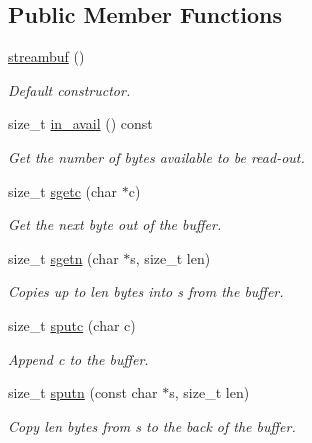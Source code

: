 \subsection*{Public Member Functions}
\begin{DoxyCompactItemize}
\item 
\hyperlink{classuio_1_1streambuf_a990efec101a2ade1c4483b604b3b975f}{streambuf} ()\hypertarget{classuio_1_1streambuf_a990efec101a2ade1c4483b604b3b975f}{}\label{classuio_1_1streambuf_a990efec101a2ade1c4483b604b3b975f}

\begin{DoxyCompactList}\small\item\em Default constructor. \end{DoxyCompactList}\item 
size\+\_\+t \hyperlink{classuio_1_1streambuf_ada2f9f2f7fb1baf6b59d03225b19c0cf}{in\+\_\+avail} () const 
\begin{DoxyCompactList}\small\item\em Get the number of bytes available to be read-\/out. \end{DoxyCompactList}\item 
size\+\_\+t \hyperlink{classuio_1_1streambuf_adaa8fa0a7ddf5869253e1cedaf252b09}{sgetc} (char $\ast$c)
\begin{DoxyCompactList}\small\item\em Get the next byte out of the buffer. \end{DoxyCompactList}\item 
size\+\_\+t \hyperlink{classuio_1_1streambuf_ab11718a2981a8842cca0fab203ad6dd9}{sgetn} (char $\ast$s, size\+\_\+t len)
\begin{DoxyCompactList}\small\item\em Copies up to {\itshape len} bytes into {\itshape s} from the buffer. \end{DoxyCompactList}\item 
size\+\_\+t \hyperlink{classuio_1_1streambuf_a6557815e43ffcab9acb8571f2dda6669}{sputc} (char c)
\begin{DoxyCompactList}\small\item\em Append {\itshape c} to the buffer. \end{DoxyCompactList}\item 
size\+\_\+t \hyperlink{classuio_1_1streambuf_ae334918cb80ba6e717ced144d5b860f7}{sputn} (const char $\ast$s, size\+\_\+t len)
\begin{DoxyCompactList}\small\item\em Copy {\itshape len} bytes from {\itshape s} to the back of the buffer. \end{DoxyCompactList}\item 

\end{DoxyCompactItemize}
